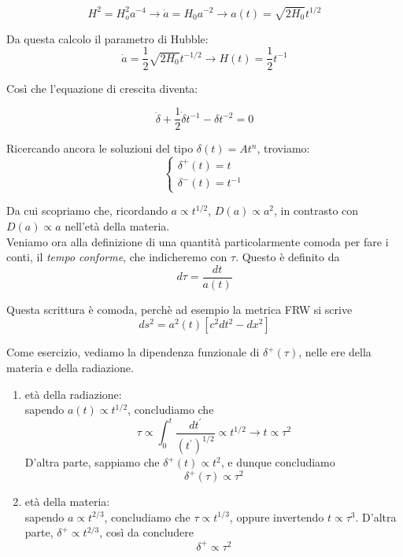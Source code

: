 \documentclass{report}
\begin{document}
\begin{equation}
    H^2 = H_o^2 a^{-4} \rightarrow \dot{a} = H_0a^{-2} \rightarrow a(t) = \sqrt{2H_0}t^{1/2}
\end{equation}

Da questa calcolo il parametro di Hubble: 
\begin{equation}
    \dot{a} = \frac{1}{2}\sqrt{2H_0}t^{-1/2} \rightarrow H(t) = \frac{1}{2}t^{-1}
\end{equation}

Così che l'equazione di crescita diventa: 

\begin{equation}
    \ddot{\delta} + \frac{1}{2}\dot{\delta}t^{-1} - \delta t^{-2} = 0 
\end{equation}

Ricercando ancora le soluzioni del tipo $\delta(t) = At^n$, troviamo: 
\[\begin{cases}
    \delta^+(t) = t \\ \delta^{-}(t) = t^{-1}
\end{cases}\]

Da cui scopriamo che, ricordando $a \propto t^{1/2}$, $D(a)\propto a^2$, in contrasto con $D(a) \propto a $ nell'età della materia. \\

Veniamo ora alla definizione di una quantità particolarmente comoda per fare i conti, il \emph{tempo conforme}, che indicheremo con $\tau$. Questo è definito da 
\begin{equation}
    d\tau = \frac{dt}{a(t)}
\end{equation}

Questa scrittura è comoda, perchè ad esempio la metrica FRW si scrive
\begin{equation}
    ds^2 = a^2(t)\left[c^2dt^2 - dx^2\right]
\end{equation}

Come esercizio, vediamo la dipendenza funzionale di $\delta^+(\tau)$, nelle ere della materia e della radiazione. 
\begin{enumerate}
    \item età della radiazione: \\ 
    sapendo $a(t)\propto t^{1/2}$, concludiamo che 
    \begin{equation}
        \tau \propto \int_0^t \frac{dt^{'}}{(t^{'})^{1/2}} \propto t^{1/2} \rightarrow t \propto \tau^2
    \end{equation}
    D'altra parte, sappiamo che $\delta^+(t) \propto t^2$, e dunque concludiamo
    \begin{equation}
        \delta^+(\tau) \propto \tau^2
    \end{equation}
    \item età della materia: \\
    sapendo $a \propto t^{2/3}$, concludiamo che $\tau \propto t^{1/3}$, oppure invertendo $t \propto \tau^3$. D'altra parte, $\delta^+ \propto t^{2/3}$, così da concludere 
    \begin{equation}
        \delta^+ \propto \tau^2
    \end{equation}
\end{enumerate}
\end{document}
